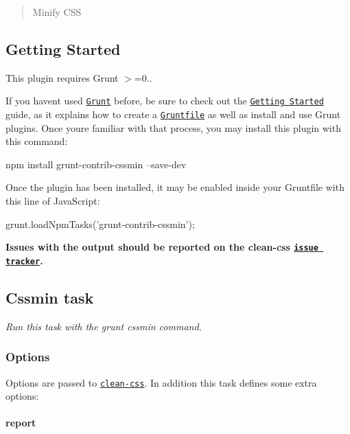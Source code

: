 \begin{quote}
Minify C\+SS \end{quote}


\subsection*{Getting Started}

This plugin requires Grunt {\ttfamily $>$=0..}

If you haven\textquotesingle{}t used \href{http://gruntjs.com/}{\tt Grunt} before, be sure to check out the \href{http://gruntjs.com/getting-started}{\tt Getting Started} guide, as it explains how to create a \href{http://gruntjs.com/sample-gruntfile}{\tt Gruntfile} as well as install and use Grunt plugins. Once you\textquotesingle{}re familiar with that process, you may install this plugin with this command\+:


\begin{DoxyCode}
npm install grunt-contrib-cssmin --save-dev
\end{DoxyCode}


Once the plugin has been installed, it may be enabled inside your Gruntfile with this line of Java\+Script\+:


\begin{DoxyCode}
grunt.loadNpmTasks('grunt-contrib-cssmin');
\end{DoxyCode}


{\bfseries Issues with the output should be reported on the clean-\/css \href{https://github.com/GoalSmashers/clean-css/issues}{\tt issue tracker}.}

\subsection*{Cssmin task}

{\itshape Run this task with the {\ttfamily grunt cssmin} command.}

\subsubsection*{Options}

Options are passed to \href{https://github.com/jakubpawlowicz/clean-css#how-to-use-clean-css-programmatically}{\tt clean-\/css}. In addition this task defines some extra options\+:

\paragraph*{report}

